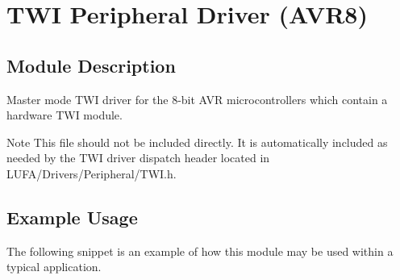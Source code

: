 \hypertarget{group__Group__TWI__AVR8}{}\section{T\+WI Peripheral Driver (A\+V\+R8)}
\label{group__Group__TWI__AVR8}
\hypertarget{group__Group__TWI__AVR8_Sec_ModDescription}{}\subsection{Module Description}\label{group__Group__TWI__AVR8_Sec_ModDescription}
Master mode T\+WI driver for the 8-\/bit A\+VR microcontrollers which contain a hardware T\+WI module.

\begin{DoxyNote}{Note}
This file should not be included directly. It is automatically included as needed by the T\+WI driver dispatch header located in L\+U\+F\+A/\+Drivers/\+Peripheral/\+T\+W\+I.\+h.
\end{DoxyNote}
\hypertarget{group__Group__TWI__AVR8_Sec_ExampleUsage}{}\subsection{Example Usage}\label{group__Group__TWI__AVR8_Sec_ExampleUsage}
The following snippet is an example of how this module may be used within a typical application.


